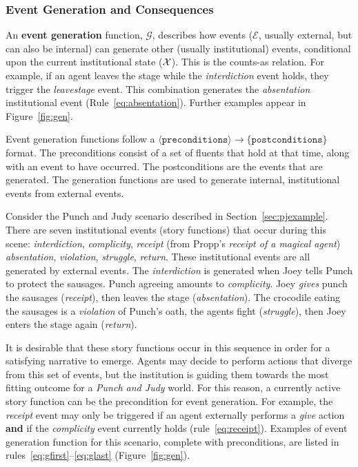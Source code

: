 \documentclass[11pt]{report}
\begin{document}

\subsubsection{Event Generation and Consequences}
An \textbf{event generation} function, $\mathcal{G}$, describes how events
($\mathcal{E}$, usually external, but can also be internal) %
can generate other (usually institutional) events, conditional upon the current institutional state ($\cal X$). This is the counts-as relation.  For example, if an agent leaves the stage while the \emph{interdiction} event holds, they trigger the \emph{leavestage} event. This combination generates the \emph{absentation} institutional event (Rule~\ref{eq:absentation}). Further examples appear in Figure~\ref{fig:gen}.

Event generation functions follow a $\langle \mathtt{preconditions} \rangle \rightarrow \{\mathtt{postconditions}\}$ format. The preconditions consist of a set of fluents that hold at that time, along with an event to have occurred. The postconditions are the events that are generated. The generation functions are used to generate internal, institutional events from external events.

Consider the Punch and Judy scenario described in Section~\ref{sec:pjexample}. There are seven institutional events (story functions) that occur during this scene: \emph{interdiction}, \emph{complicity}, \emph{receipt} (from Propp's \emph{receipt of a magical agent}) \emph{absentation}, \emph{violation}, \emph{struggle}, \emph{return}.
These institutional events are all generated by external events. The \emph{interdiction} is generated when Joey tells Punch to protect the sausages. Punch agreeing amounts to \emph{complicity}. Joey \emph{gives} punch the sausages (\emph{receipt}), then leaves the stage (\emph{absentation}). The crocodile eating the sausages is a \emph{violation} of Punch's oath, the agents fight (\emph{struggle}), then Joey enters the stage again (\emph{return}).

It is desirable that these story functions occur in this sequence in order for a satisfying narrative to emerge. Agents may decide to perform actions that diverge from this set of events, but the institution is guiding them towards the most fitting outcome for a \emph{Punch and Judy} world. For this reason, a currently active story function can be the precondition for event generation. For example, the \emph{receipt} event may only be triggered if an agent externally performs a \emph{give} action \textbf{and} if the \emph{complicity} event currently holds (rule~\ref{eq:receipt}).
Examples of event generation function for this scenario, complete with preconditions, are listed in rules~\ref{eq:gfirst}--\ref{eq:glast} (Figure~\ref{fig:gen}).
\end{document}
